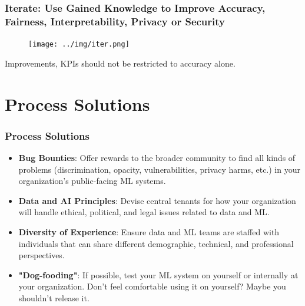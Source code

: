 \documentclass[11pt,
               aspectratio=169,
               hyperref={colorlinks}
               ]{beamer}
\begin{document}
			\begin{frame}	
	
				\frametitle{Iterate: Use Gained Knowledge to Improve Accuracy, Fairness, Interpretability, Privacy or Security}		
				
				\begin{figure}[htb]
					\begin{center}
						\texttt{[image: ../img/iter.png]}
						\label{fig:blueprint}
					\end{center}
				\end{figure}	
	
				\centering
				Improvements, KPIs should not be restricted to accuracy alone.
			
			\end{frame}

	\section{Process Solutions}

		\begin{frame}
	
			\frametitle{Process Solutions}
			
			\begin{itemize}
				
				\item \textbf{Bug Bounties}: Offer rewards to the broader community to find all kinds of problems (discrimination, opacity, vulnerabilities, privacy harms, etc.) in your organization's public-facing ML systems. 
				
				\item \textbf{Data and AI Principles}: Devise central tenants for how your organization will handle ethical, political, and legal issues related to data and ML.
				
				\item \textbf{Diversity of Experience}: Ensure data and ML teams are staffed with individuals that can share different demographic, technical, and professional perspectives. 
				
				\item \textbf{"Dog-fooding"}: If possible, test your ML system on yourself or internally at your organization. Don't feel comfortable using it on yourself? Maybe you shouldn't release it. 
				
			\end{itemize}
					
		\end{frame}
		
\end{document}
